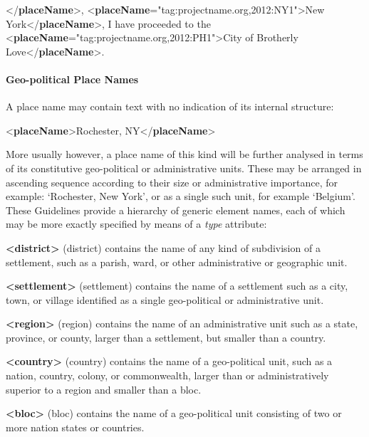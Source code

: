 \begin{shaded}
{</\textbf{placeName}>}, {<\textbf{placeName}\hspace*{1em}{ref}="{tag:projectname.org,2012:NY1}">}New York{</\textbf{placeName}>}, I have proceeded\mbox{}\newline 
 to the {<\textbf{placeName}\hspace*{1em}{ref}="{tag:projectname.org,2012:PH1}">}City of Brotherly Love{</\textbf{placeName}>}.\end{shaded}\egroup\par 
\paragraph[{Geo-political Place Names}]{Geo-political Place Names}\label{NDPLGU}\par
A place name may contain text with no indication of its internal structure: \par\bgroup{}\exampleFont \begin{shaded}\noindent\mbox{}{<\textbf{placeName}>}Rochester, NY{</\textbf{placeName}>}\end{shaded}\egroup\par \noindent  More usually however, a place name of this kind will be further analysed in terms of its constitutive geo-political or administrative units. These may be arranged in ascending sequence according to their size or administrative importance, for example: ‘Rochester, New York’, or as a single such unit, for example ‘Belgium’. These Guidelines provide a hierarchy of generic element names, each of which may be more exactly specified by means of a {\itshape type} attribute: 
\begin{sansreflist}
  
\item [\textbf{<district>}] (district) contains the name of any kind of subdivision of a settlement, such as a parish, ward, or other administrative or geographic unit.
\item [\textbf{<settlement>}] (settlement) contains the name of a settlement such as a city, town, or village identified as a single geo-political or administrative unit.
\item [\textbf{<region>}] (region) contains the name of an administrative unit such as a state, province, or county, larger than a settlement, but smaller than a country.
\item [\textbf{<country>}] (country) contains the name of a geo-political unit, such as a nation, country, colony, or commonwealth, larger than or administratively superior to a region and smaller than a bloc.
\item [\textbf{<bloc>}] (bloc) contains the name of a geo-political unit consisting of two or more nation states or countries.
\end{sansreflist}
